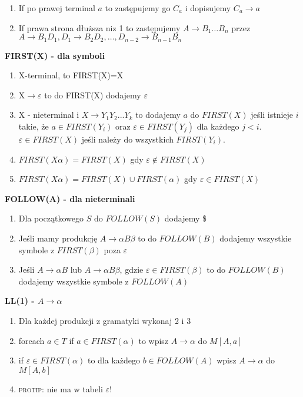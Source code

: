 \begin{multicols}{3}
\begin{enumerate}
      \item If po prawej terminal $a$ to zastępujemy go $C_{a}$ i dopisujemy $C_{a} \rightarrow a$
      \item If prawa strona dłuższa niz 1 to zastępujemy $A \rightarrow B_{1} \ldots B_{n}$ przez \\
    $A \rightarrow B_{1}D_{1}, D_{1} \rightarrow B_{2}D_{2}, \ldots ,D_{n-2} \rightarrow B_{n-1}B_{n}$
    \end{enumerate}
    \textbf{FIRST(X) - dla symboli}
    \begin{enumerate}
      \item X-terminal, to FIRST(X)={X}
      \item X$\rightarrow \varepsilon$ to do FIRST(X) dodajemy $\varepsilon$
      \item X - nieterminal i $X \rightarrow Y_{1}Y_{2}...Y_{k}$ to dodajemy $a$ do $FIRST(X)$ jeśli istnieje $i$ takie, że $a \in FIRST(Y_{i})$ oraz $\varepsilon \in FIRST(Y_{j})$ dla każdego $j<i$. \\ $\varepsilon \in FIRST(X)$ jeśli należy do wszystkich $FIRST(Y_{i})$. 
      \item $FIRST(X\alpha) = FIRST(X)$ gdy $\varepsilon \notin FIRST(X)$
      \item $FIRST(X\alpha) = FIRST(X) \cup FIRST(\alpha)$ gdy $\varepsilon \in FIRST(X)$
    \end{enumerate}
    \textbf{FOLLOW(A) - dla nieterminali}
    \begin{enumerate}
      \item Dla początkowego $S$ do $FOLLOW(S)$ dodajemy \$
      \item Jeśli mamy produkcję $A\rightarrow\alpha B \beta$ to do $FOLLOW(B)$ dodajemy wszystkie symbole z $FIRST(\beta)$ poza $\varepsilon$
      \item Jeśli $A\rightarrow\alpha B $ lub $A\rightarrow\alpha B \beta$, gdzie $\varepsilon \in FIRST(\beta)$ to do $FOLLOW(B)$ dodajemy wszystkie symbole z $FOLLOW(A)$
    \end{enumerate}
    \textbf{LL(1) - $A \rightarrow \alpha$}
    \begin{enumerate}
      \item Dla każdej produkcji z gramatyki wykonaj 2 i 3
      \item foreach $a \in T$ if $a \in FIRST(\alpha)$ to wpisz $A\rightarrow \alpha$ do $M[A,a]$
      \item if $\varepsilon \in FIRST(\alpha)$ to dla każdego $b \in FOLLOW(A)$ wpisz $A\rightarrow \alpha$ do $M[A,b]$
      \item \textsc{protip}: nie ma w tabeli $\varepsilon$!

\end{enumerate}
\end{multicols}
